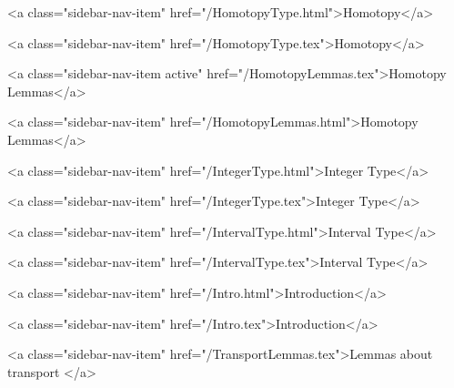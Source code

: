       
        
          <a class="sidebar-nav-item" href="/HomotopyType.html">Homotopy</a>
        
      
    
      
        
          <a class="sidebar-nav-item" href="/HomotopyType.tex">Homotopy</a>
        
      
    
      
        
          <a class="sidebar-nav-item active" href="/HomotopyLemmas.tex">Homotopy Lemmas</a>
        
      
    
      
        
          <a class="sidebar-nav-item" href="/HomotopyLemmas.html">Homotopy Lemmas</a>
        
      
    
      
        
          <a class="sidebar-nav-item" href="/IntegerType.html">Integer Type</a>
        
      
    
      
        
          <a class="sidebar-nav-item" href="/IntegerType.tex">Integer Type</a>
        
      
    
      
        
          <a class="sidebar-nav-item" href="/IntervalType.html">Interval Type</a>
        
      
    
      
        
          <a class="sidebar-nav-item" href="/IntervalType.tex">Interval Type</a>
        
      
    
      
        
          <a class="sidebar-nav-item" href="/Intro.html">Introduction</a>
        
      
    
      
        
          <a class="sidebar-nav-item" href="/Intro.tex">Introduction</a>
        
      
    
      
        
          <a class="sidebar-nav-item" href="/TransportLemmas.tex">Lemmas about transport </a>
        
      
    
